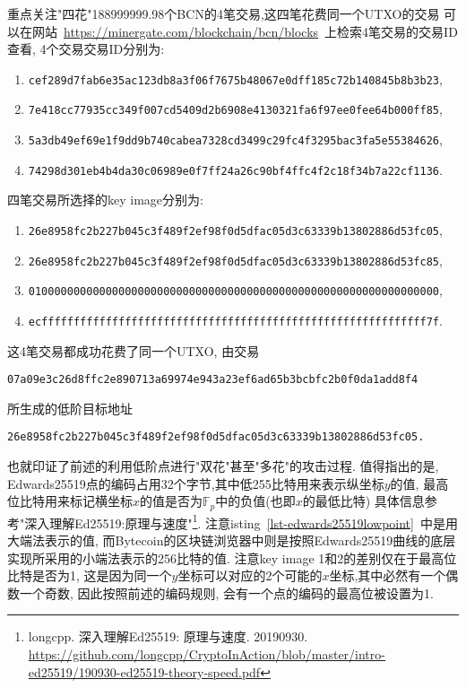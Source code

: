 \documentclass{article}
\newcommand{\F}{\mathbb{F}}
\begin{document}
重点关注"四花"188999999.98个BCN的4笔交易,这四笔花费同一个UTXO的交易
可以在网站~\url{https://minergate.com/blockchain/bcn/blocks}~上检索4笔交易的交易ID查看,
4个交易交易ID分别为: 
\begin{enumerate}
\item \texttt{cef289d7fab6e35ac123db8a3f06f7675b48067e0dff185c72b140845b8b3b23},
\item \texttt{7e418cc77935cc349f007cd5409d2b6908e4130321fa6f97ee0fee64b000ff85},
\item \texttt{5a3db49ef69e1f9dd9b740cabea7328cd3499c29fc4f3295bac3fa5e55384626},
\item \texttt{74298d301eb4b4da30c06989e0f7ff24a26c90bf4ffc4f2c18f34b7a22cf1136}.
\end{enumerate}
四笔交易所选择的key image分别为:
\begin{enumerate}
\item \texttt{26e8958fc2b227b045c3f489f2ef98f0d5dfac05d3c63339b13802886d53fc05},
\item \texttt{26e8958fc2b227b045c3f489f2ef98f0d5dfac05d3c63339b13802886d53fc85},
\item \texttt{0100000000000000000000000000000000000000000000000000000000000000},
\item \texttt{ecffffffffffffffffffffffffffffffffffffffffffffffffffffffffffff7f}.
\end{enumerate}
这4笔交易都成功花费了同一个UTXO, 由交易\\
\centerline{\texttt{07a09e3c26d8ffc2e890713a69974e943a23ef6ad65b3bcbfc2b0f0da1add8f4}}
所生成的低阶目标地址\\
\centerline{\texttt{26e8958fc2b227b045c3f489f2ef98f0d5dfac05d3c63339b13802886d53fc05.}}
也就印证了前述的利用低阶点进行"双花"甚至"多花"的攻击过程.
值得指出的是, Edwards25519点的编码占用32个字节,其中低255比特用来表示纵坐标$y$的值,
最高位比特用来标记横坐标$x$的值是否为$\F_p$中的负值(也即$x$的最低比特)
具体信息参考"深入理解Ed25519:原理与速度"\footnote{
longcpp. 深入理解Ed25519: 原理与速度. 20190930. 
\url{https://github.com/longcpp/CryptoInAction/blob/master/intro-ed25519/190930-ed25519-theory-speed.pdf}}.
注意isting~\ref{lst-edwards25519lowpoint}~中是用大端法表示的值,
而Bytecoin的区块链浏览器中则是按照Edwards25519曲线的底层实现所采用的小端法表示的256比特的值.
注意key image 1和2的差别仅在于最高位比特是否为1,
这是因为同一个$y$坐标可以对应的2个可能的$x$坐标,其中必然有一个偶数一个奇数,
因此按照前述的编码规则, 会有一个点的编码的最高位被设置为1.
\end{document}
